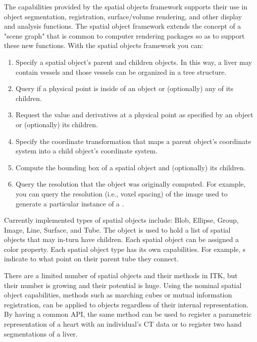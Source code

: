 The capabilities provided by the spatial objects framework supports their use
in object segmentation, registration, surface/volume rendering, and other
display and analysis functions. The spatial object framework extends the
concept of a "scene graph" that is common to computer rendering packages so
as to support these new functions. With the spatial objects framework you
can:
\begin{enumerate}

        \item Specify a spatial object's parent and children objects.  In
        this way, a liver may contain vessels and those vessels can be
        organized in a tree structure.

        \item Query if a physical point is inside of an object or
        (optionally) any of its children.

        \item Request the value and derivatives at a physical point as
        specified by an object or (optionally) its children.

        \item Specify the coordinate transformation that maps a parent
        object's coordinate system into a child object's coordinate system.

        \item Compute the bounding box of a spatial object and (optionally)
        its children.

        \item Query the resolution that the object was originally
        computed.  For example, you can query the resolution (i.e., voxel
        spacing) of the image used to generate a particular instance of a
        .
\end{enumerate}

Currently implemented types of spatial objects include: Blob, Ellipse, Group,
Image, Line, Surface, and Tube.  The  object is used to hold
a list of spatial objects that may in-turn have children.  Each spatial
object can be assigned a color property.  Each spatial object type has its
own capabilities. For example, s indicate to what
point on their parent tube they connect.

There are a limited number of spatial objects and their methods in ITK, but
their number is growing and their potential is huge. Using the nominal
spatial object capabilities, methods such as marching cubes or mutual
information registration, can be applied to objects regardless of their
internal representation. By having a common API, the same method can be used
to register a parametric representation of a heart with an individual's CT
data or to register two hand segmentations of a liver.

